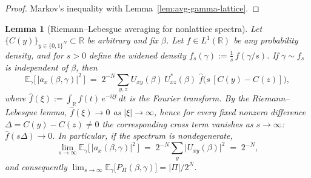 \documentclass[a4paper,onecolumn,11pt,unpublished]{quantumarticle}
\newtheorem{lemma}[theorem]{Lemma}
\theoremstyle{remark}
\begin{document}
\begin{proof}
Markov’s inequality with Lemma~\ref{lem:avg-gamma-lattice}.
\end{proof}

\begin{lemma}[Riemann--Lebesgue averaging for nonlattice spectra]
\label{lem:RL-averaging}
Let $\{C(y)\}_{y\in\{0,1\}^N}\subset\mathbb R$ be arbitrary and fix $\beta$.
Let $f\in L^1(\mathbb R)$ be any probability density, and for $s>0$ define the widened
density $f_s(\gamma):=\frac{1}{s}\,f(\gamma/s)$. If $\gamma\sim f_s$ is independent of $\beta$, then
\[
  \mathbb{E}_\gamma\!\bigl[\,|a_x(\beta,\gamma)|^2\,\bigr]
  \;=\;
  2^{-N}\!\sum_{y,z} U_{xy}(\beta)\,U^*_{xz}(\beta)\;
  \widehat{f}\!\bigl(s\,[C(y)-C(z)]\bigr),
\]
where $\widehat f(\xi):=\int_{\mathbb R} f(t)\,e^{-i\xi t}\,dt$ is the Fourier transform.
By the Riemann--Lebesgue lemma, $\widehat f(\xi)\to 0$ as $|\xi|\to\infty$, hence for every fixed
nonzero difference $\Delta=C(y)-C(z)\neq 0$ the corresponding cross term vanishes as $s\to\infty$:
$\widehat f(s\Delta)\to 0$. In particular, if the spectrum is nondegenerate,
\[
  \lim_{s\to\infty}\mathbb{E}_\gamma\!\bigl[\,|a_x(\beta,\gamma)|^2\,\bigr]
  \;=\; 2^{-N}\sum_{y}\bigl|U_{xy}(\beta)\bigr|^2 \;=\; 2^{-N},
\]
and consequently $\lim_{s\to\infty}\mathbb{E}_\gamma\!\bigl[P_\Pi(\beta,\gamma)\bigr]=|\Pi|/2^N$.
\end{lemma}
\end{document}
